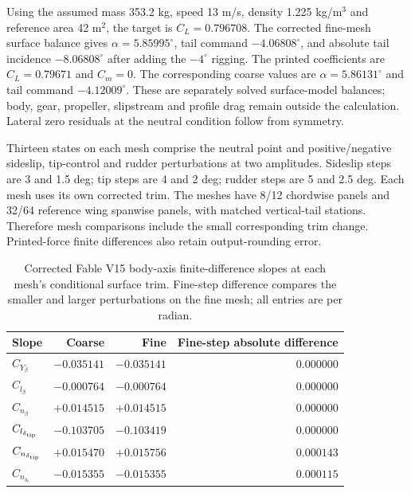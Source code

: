 \documentclass[11pt,a4paper]{article}
\begin{document}
Using the assumed mass 353.2 kg, speed 13 m/s, density 1.225 kg/m$^3$ and
reference area 42 m$^2$, the target is $C_L=0.796708$.
The corrected fine-mesh surface balance gives $\alpha=5.85995^\circ$, tail command $-4.06808^\circ$, and absolute tail incidence $-8.06808^\circ$ after adding the $-4^\circ$ rigging. The printed coefficients are $C_L=0.79671$ and $C_m=0$. The corresponding coarse values are $\alpha=5.86131^\circ$ and tail command $-4.12009^\circ$. These are separately solved surface-model balances; body, gear, propeller, slipstream and profile drag remain outside the calculation. Lateral zero residuals at the neutral condition follow from symmetry.

Thirteen states on each mesh comprise the neutral point and positive/negative
sideslip, tip-control and rudder perturbations at two amplitudes. Sideslip
steps are 3 and 1.5 deg; tip steps are 4 and 2 deg; rudder steps are 5 and
2.5 deg. Each mesh uses its own corrected trim. The meshes have 8/12 chordwise
panels and 32/64 reference wing spanwise panels, with matched vertical-tail
stations. Therefore mesh comparisons include the small corresponding trim
change. Printed-force finite differences also retain output-rounding error.

\begin{table}[p]\centering\small
\caption{Corrected Fable V15 body-axis finite-difference slopes at each mesh's conditional surface trim. Fine-step difference compares the smaller and larger perturbations on the fine mesh; all entries are per radian.}
\label{tab:v15-fable-lateral}
\begin{tabular}{lrrr}\toprule
Slope & Coarse & Fine & Fine-step absolute difference\\\midrule
$C_{Y_\beta}$ & $-0.035141$ & $-0.035141$ & $0.000000$\\
$C_{l_\beta}$ & $-0.000764$ & $-0.000764$ & $0.000000$\\
$C_{n_\beta}$ & $+0.014515$ & $+0.014515$ & $0.000000$\\
$C_{l_{\delta_{\rm tip}}}$ & $-0.103705$ & $-0.103419$ & $0.000000$\\
$C_{n_{\delta_{\rm tip}}}$ & $+0.015470$ & $+0.015756$ & $0.000143$\\
$C_{n_{\delta_r}}$ & $-0.015355$ & $-0.015355$ & $0.000115$\\
\bottomrule\end{tabular}\end{table}
\end{document}
